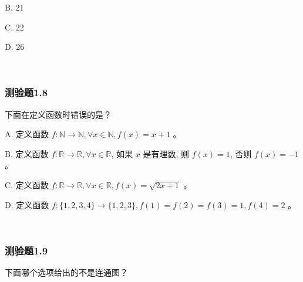 \documentclass[UTF8, heading=true]{ctexart}
\begin{document}
B. 21

C. 22

D. 26

\textcolor{white}{答案：B}

\subsubsection{测验题1.8}

下面在定义函数时错误的是？

A. 定义函数 $f: \mathbb{N} \rightarrow \mathbb{N}, \forall x \in \mathbb{N}, f(x)=x+1$ 。

B. 定义函数 $f: \mathbb{R} \rightarrow \mathbb{R}, \forall x \in \mathbb{R}$, 如果 $x$ 是有理数, 则 $f(x)=1$, 否则 $f(x)=-1$ 。

C. 定义函数 $f: \mathbb{R} \rightarrow \mathbb{R}, \forall x \in \mathbb{R}, f(x)=\sqrt{2 x+1}$ 。

D. 定义函数 $f:\{1,2,3,4\} \rightarrow\{1,2,3\}, f(1)=f(2)=f(3)=1, f(4)=2$ 。

\textcolor{white}{答案：C}

\subsubsection{测验题1.9}

下面哪个选项给出的不是连通图？
\end{document}
